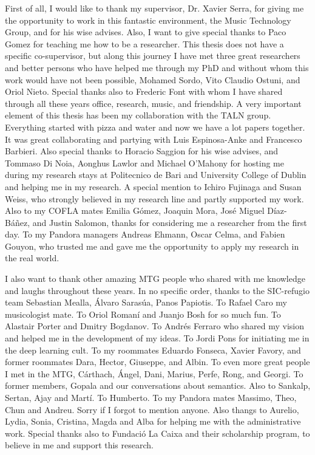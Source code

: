 First of all, I would like to thank my supervisor, Dr. Xavier Serra, for giving me the opportunity to work in this fantastic environment, the Music Technology Group, and for his wise advises. Also, I want to give special thanks to Paco Gomez for teaching me how to be a researcher. This thesis does not have a specific co-supervisor, but along this journey I have met three great researchers and better persons who have helped me through my PhD and without whom this work would have not been possible, Mohamed Sordo, Vito Claudio Ostuni, and Oriol Nieto. 
Special thanks also to Frederic Font with whom I have shared through all these years office, research, music, and friendship.
A very important element of this thesis has been my collaboration with the TALN group. Everything started with pizza and water and now we have a lot papers together. It was great collaborating and partying with Luis Espinosa-Anke and Francesco Barbieri. Also special thanks to Horacio Saggion for his wise advises, and Tommaso Di Noia, Aonghus Lawlor and Michael O'Mahony for hosting me during my research stays at Politecnico de Bari and University College of Dublin and helping me in my research. 
A special mention to Ichiro Fujinaga and Susan Weiss, who strongly believed in my research line and partly supported my work. Also to my COFLA mates Emilia Gómez, Joaquin Mora, José Miguel Díaz-Báñez, and Justin Salomon, thanks for considering me a researcher from the first day. 
To my Pandora managers Andreas Ehmann, Oscar Celma, and Fabien Gouyon, who trusted me and gave me the opportunity to apply my research in the real world.

I also want to thank other amazing MTG people who shared with me knowledge and laughs throughout these years. In no specific order, thanks to the SIC-refugio team
Sebastian Mealla, Álvaro Sarasúa, Panos Papiotis. To Rafael Caro my musicologist mate. To Oriol Romaní and Juanjo Bosh for so much fun. To Alastair Porter and Dmitry Bogdanov. To Andrés Ferraro who shared my vision and helped me in the development of my ideas. To Jordi Pons for initiating me in the deep learning cult. To my roommates Eduardo Fonseca, Xavier Favory, and former roommates Dara, Hector, Giuseppe, and Albin. To even more great people I met in the MTG, Cárthach, Ángel, Dani, Marius, Perfe, Rong, and Georgi. To former members, Gopala and our conversations about semantics. Also to Sankalp, Sertan, Ajay and Martí. To Humberto. To my Pandora mates Massimo, Theo, Chun and Andreu. Sorry if I forgot to mention anyone.
Also thangs to Aurelio, Lydia, Sonia, Cristina, Magda and Alba for helping me with the administrative work.
Special thanks also to Fundació La Caixa and their scholarship program, to believe in me and support this research.

